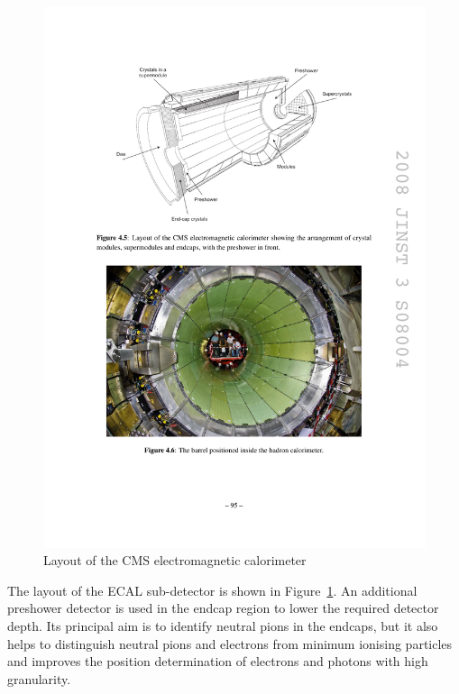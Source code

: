 \begin{figure}[!htbp]
  \centering
  \leavevmode
  \includegraphics[width=\columnwidth]{ECAL}
  \caption[Layout of the CMS electromagnetic calorimeter]{Layout of the CMS electromagnetic calorimeter \autocite{CMS}}
  \label{fig:ECAL}
\end{figure}

The layout of the ECAL sub-detector is shown in Figure~\ref{fig:ECAL}. An additional preshower detector is used in the
endcap region to lower the required detector depth. Its principal aim is to identify neutral pions in the endcaps, but
it also helps to distinguish neutral pions and electrons from minimum ionising particles and improves the position
determination of electrons and photons with high granularity.



